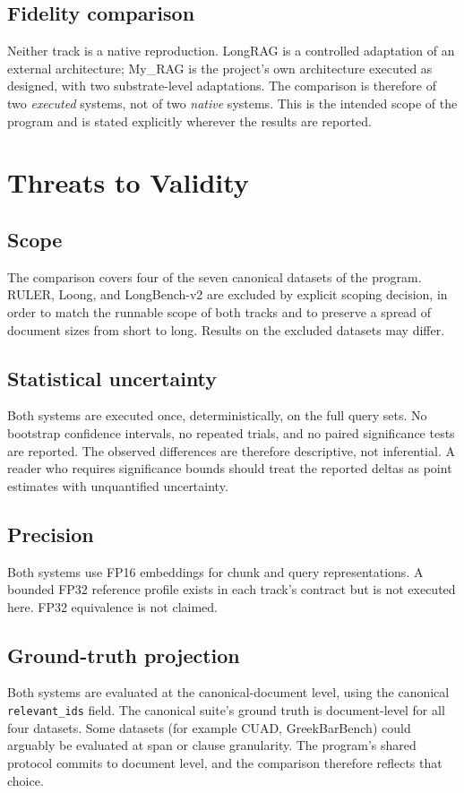 \documentclass[11pt,a4paper]{article}
\begin{document}
\subsection{Fidelity comparison}
Neither track is a native reproduction. LongRAG is a controlled
adaptation of an external architecture; My\_RAG is the project's own
architecture executed as designed, with two substrate-level
adaptations. The comparison is therefore of two \emph{executed}
systems, not of two \emph{native} systems. This is the intended
scope of the program and is stated explicitly wherever the results
are reported.

\section{Threats to Validity}\label{sec:threats}

\subsection{Scope}
The comparison covers four of the seven canonical datasets of the
program. RULER, Loong, and LongBench-v2 are excluded by explicit
scoping decision, in order to match the runnable scope of both
tracks and to preserve a spread of document sizes from short to
long. Results on the excluded datasets may differ.

\subsection{Statistical uncertainty}
Both systems are executed once, deterministically, on the full query
sets. No bootstrap confidence intervals, no repeated trials, and no
paired significance tests are reported. The observed differences are
therefore descriptive, not inferential. A reader who requires
significance bounds should treat the reported deltas as point
estimates with unquantified uncertainty.

\subsection{Precision}
Both systems use FP16 embeddings for chunk and query
representations. A bounded FP32 reference profile exists in each
track's contract but is not executed here. FP32 equivalence is not
claimed.

\subsection{Ground-truth projection}
Both systems are evaluated at the canonical-document level, using
the canonical \texttt{relevant\_ids} field. The canonical suite's
ground truth is document-level for all four datasets. Some datasets
(for example CUAD, GreekBarBench) could arguably be evaluated at
span or clause granularity. The program's shared protocol commits to
document level, and the comparison therefore reflects that choice.
\end{document}
